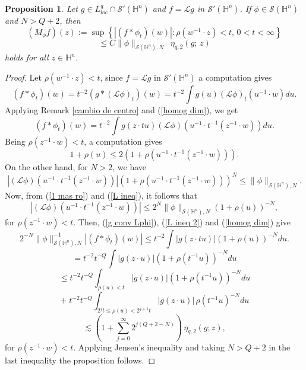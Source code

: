 \documentclass[10pt,a4paper]{amsart}
\newtheorem{proposition}{Proposition}
\begin{document}
\begin{proposition} \label{Lg dist} Let $g \in L^q_{loc} \cap \mathcal{S}'(\mathbb{H}^n)$ and $f = \mathcal{L} g$ in 
$\mathcal{S}'(\mathbb{H}^n)$. If $\phi \in \mathcal{S}(\mathbb{H}^n)$ and $N > Q+2$, then
\[
(M_{\phi}f)(z) := \sup \left\{ |(f \ast \phi_t)(w)| : \rho(w^{-1} \cdot z) < t, \, 0 < t < \infty \right\}  
\]
\[
\leq C \| \phi \|_{\mathcal{S}(\mathbb{H}^{n}), N}  \,\,\, \eta_{q, 2}(g; \, z)
\]
holds for all $z \in \mathbb{H}^n$.
\end{proposition}

\begin{proof} Let $\rho(w^{-1} \cdot z) < t$, since $f = \mathcal{L} g$ in $\mathcal{S}'(\mathbb{H}^n)$ a computation gives
\[
(f \ast \phi_t)(w) = t^{-2} (g \ast (\mathcal{L} \phi)_t)(w) = t^{-2} \int g(u) (\mathcal{L} \phi)_t (u^{-1} \cdot w) du.
\]
Applying Remark \ref{cambio de centro} and (\ref{homog dim}), we get
\begin{equation} \label{g conv Lphi}
(f \ast \phi_t)(w) = t^{-2} \int g(z \cdot tu) (\mathcal{L} \phi) (u^{-1} \cdot t^{-1}(z^{-1} \cdot w)) du.
\end{equation}
Being $\rho(z^{-1} \cdot w) < t$, a computation gives
\begin{equation} \label{1 mas ro}
1 + \rho(u) \leq 2 \left( 1 + \rho(u^{-1} \cdot t^{-1}(z^{-1} \cdot w)) \right).
\end{equation}
On the other hand, for $N > 2$, we have
\begin{equation} \label{L ineq}
\left|(\mathcal{L} \phi) (u^{-1} \cdot t^{-1}(z^{-1} \cdot w))\right| \left( 1 + \rho(u^{-1} \cdot t^{-1}(z^{-1} \cdot w)) \right)^N \leq 
\| \phi \|_{\mathcal{S}(\mathbb{H}^{n}), N}.
\end{equation}
Now, from (\ref{1 mas ro}) and (\ref{L ineq}), it follows that
\begin{equation} \label{L ineq 2}
\left|(\mathcal{L} \phi) (u^{-1} \cdot t^{-1}(z^{-1} \cdot w))\right| \leq 2^N \| \phi \|_{\mathcal{S}(\mathbb{H}^{n}), N} (1 + \rho(u))^{-N},
\end{equation}
for $\rho(z^{-1} \cdot w) < t$. Then, (\ref{g conv Lphi}), (\ref{L ineq 2}) and (\ref{homog dim}) give
\[
2^{-N} \| \phi \|_{\mathcal{S}(\mathbb{H}^{n}), N}^{-1} \left|(f \ast \phi_t)(w) \right| \leq  t^{-2} \int |g(z \cdot tu)|(1 + \rho(u))^{-N} du.
\]
\[
= t^{-2} t^{-Q} \int |g(z \cdot u)|(1 + \rho(t^{-1} u))^{-N} du
\]
\[
\leq t^{-2} t^{-Q} \int_{\rho(u) < t} |g(z \cdot u)|(1 + \rho(t^{-1} u))^{-N} du 
\]
\[
+ \,\, t^{-2} t^{-Q} \int_{2^j t \leq \rho(u) < 2^{j+1}t} |g(z \cdot u)| \, \rho(t^{-1} u)^{-N} du 
\]
\[
\lesssim \left( 1 + \sum_{j=0}^{\infty} 2^{j(Q+2-N)} \right) \, \eta_{q, 2}(g; z),
\]
for $\rho(z^{-1} \cdot w) < t$. Applying Jensen's inequality and taking $N > Q+2$ in the last inequality the proposition follows.
\end{proof}
\end{document}
